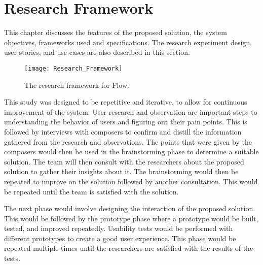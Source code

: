 %
%
%                 

\chapter{Research Framework}

This chapter discusses the features of the proposed solution, the system objectives, frameworks used and specifications. The research experiment design, user stories, and use cases are also described in this section. 

\begin{figure}[H]
	\centering
	\texttt{[image: Research\_Framework]}
    \caption{The research framework for Flow.}
    \label{fig:researchframework}
\end{figure}

This study was designed to be repetitive and iterative, to allow for continuous improvement of the system. User research and observation are important steps to understanding the behavior of users and figuring out their pain points. This is followed by interviews with composers to confirm and distill the information gathered from the research and observations. The points that were given by the composers would then be used in the brainstorming phase to determine a suitable solution. The team will then consult with the researchers about the proposed solution to gather their insights about it. The brainstorming would then be repeated to improve on the solution followed by another consultation. This would be repeated until the team is satisfied with the solution.

The next phase would involve designing the interaction of the proposed solution. This would be followed by the prototype phase where a prototype would be built, tested, and improved repeatedly. Usability tests would be performed with different prototypes to create a good user experience. This phase would be repeated multiple times until the researchers are satisfied with the results of the tests.

